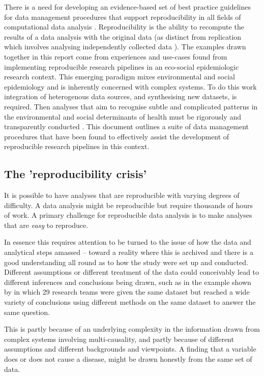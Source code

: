 \documentclass[11pt,a4paper]{article}
\begin{document}
There is a need for developing an evidence-based set of best practice
guidelines for data management procedures that support reproducibility in all fields of computational data analysis \citep{Long2008,Noble2009,Peng}. 
Reproducibility is the ability to recompute the results of a data
analysis with the original data (as distinct from replication which involves analysing independently collected data \citep{Peng2011}). 
The examples drawn
together in this report come from experiences and use-cases found from implementing reproducible
research pipelines in an
eco-social epidemiologic research context. This emerging paradigm 
mixes environmental and social epidemiology and is inherently concerned with complex systems. To do this work 
integration of heterogenous data sources, and synthesising new datasets, is required.  Then analyses that aim to  recognise subtle and complicated patterns in
the environmental and social determinants of health must be rigorously and transparently conducted
\citep{McMichael2013}. This document outlines a suite of data management
procedures that have been found to effectively assist the development of
reproducible research pipelines in this context.

\subsection{The 'reproducibility crisis'}

It is possible to have analyses that
are reproducible with varying degrees of difficulty. A data analysis
might be reproducible but require thousands of hours of work. A primary
challenge for reproducible data analysis is to make analyses that are
\emph{easy} to reproduce.

In essence this requires attention to be turned to the issue of how the
data and analytical steps amassed -- toward a reality where this is
archived and there is a good understanding all round as to how the study
were set up and conducted. Different assumptions or different treatment
of the data could conceivably lead to different inferences and
conclusions being drawn, such as in the example shown by \citet{Silberzahn2015} in which 29 research teams were given the same dataset
but reached a wide variety of conclusions using different methods on the
same dataset to answer the same question.

This is partly because of an underlying complexity in the information
drawn from complex systems involving multi-causality, and partly because
of different assumptions and different backgrounds and viewpoints. A
finding that a variable does or does not cause a disease, might be drawn
honestly from the same set of data.
\end{document}

